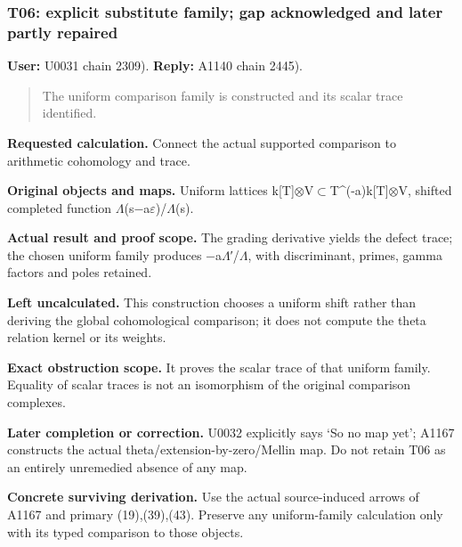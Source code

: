 \subsubsection{T06: explicit substitute family; gap acknowledged and
later partly
repaired}\label{TranscriptLedgerStage:t06-explicit-substitute-family-gap-acknowledged-and-later-partly-repaired}

\textbf{User:} U0031
\protect{} chain 2309).
\textbf{Reply:} A1140
\protect{} chain 2445).

\begin{quote}
The uniform comparison family is constructed and its scalar trace
identified.
\end{quote}

\textbf{Requested calculation.} Connect the actual supported comparison
to arithmetic cohomology and trace.

\textbf{Original objects and maps.} Uniform lattices
k[T]\allowbreak{}\ensuremath{⊗}\allowbreak{}V\allowbreak{}\ensuremath{⊂}\allowbreak{}T\textasciicircum{}(-a)k[T]\allowbreak{}\ensuremath{⊗}\allowbreak{}V,
shifted completed function
\allowbreak{}\ensuremath{Λ}\allowbreak{}(s\allowbreak{}\ensuremath{−}\allowbreak{}a\allowbreak{}\ensuremath{ε}\allowbreak{})/\allowbreak{}\ensuremath{Λ}\allowbreak{}(s).

\textbf{Actual result and proof scope.} The grading derivative yields
the defect trace; the chosen uniform family produces
\allowbreak{}\ensuremath{−}\allowbreak{}a\allowbreak{}\ensuremath{Λ}\allowbreak{}′/\allowbreak{}\ensuremath{Λ}\allowbreak{},
with discriminant, primes, gamma factors and poles retained.

\textbf{Left uncalculated.} This construction chooses a uniform shift
rather than deriving the global cohomological comparison; it does not
compute the theta relation kernel or its weights.

\textbf{Exact obstruction scope.} It proves the scalar trace of that
uniform family. Equality of scalar traces is not an isomorphism of the
original comparison complexes.

\textbf{Later completion or correction.} U0032 explicitly says `So no
map yet'; A1167 constructs the actual theta/extension-by-zero/Mellin
map. Do not retain T06 as an entirely unremedied absence of any map.

\textbf{Concrete surviving derivation.} Use the actual source-induced
arrows of A1167 and primary (19),(39),(43). Preserve any uniform-family
calculation only with its typed comparison to those objects.

